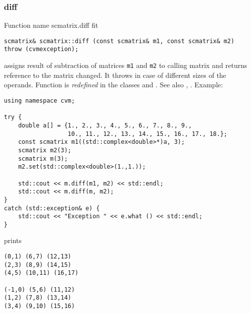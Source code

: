 \subsubsection{diff}
Function%
\pdfdest name {scmatrix.diff} fit
\begin{verbatim}
scmatrix& scmatrix::diff (const scmatrix& m1, const scmatrix& m2)
throw (cvmexception);
\end{verbatim}
assigns  result of subtraction of
matrices \verb"m1" and \verb"m2" to  calling matrix
and returns  reference to
the matrix changed.
It throws  
in case of different sizes of the operands.
Function is \emph{redefined} in the classes
and .
See also ,
.
Example:
\begin{Verbatim}
using namespace cvm;

try {
    double a[] = {1., 2., 3., 4., 5., 6., 7., 8., 9.,
                  10., 11., 12., 13., 14., 15., 16., 17., 18.};
    const scmatrix m1((std::complex<double>*)a, 3);
    scmatrix m2(3);
    scmatrix m(3);
    m2.set(std::complex<double>(1.,1.));

    std::cout << m.diff(m1, m2) << std::endl;
    std::cout << m.diff(m, m2);
}
catch (std::exception& e) {
    std::cout << "Exception " << e.what () << std::endl;
}
\end{Verbatim}
prints
\begin{Verbatim}
(0,1) (6,7) (12,13)
(2,3) (8,9) (14,15)
(4,5) (10,11) (16,17)

(-1,0) (5,6) (11,12)
(1,2) (7,8) (13,14)
(3,4) (9,10) (15,16)
\end{Verbatim}
\newpage



